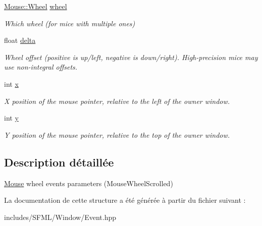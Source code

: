 \begin{DoxyCompactItemize}
\item 
\mbox{\label{structsf_1_1Event_1_1MouseWheelScrollEvent_a1d82dccecc46968d517b2fc66639dd74}} 
\hyperlink{classsf_1_1Mouse_a60dd479a43f26f200e7957aa11803ff4}{Mouse\+::\+Wheel} \hyperlink{structsf_1_1Event_1_1MouseWheelScrollEvent_a1d82dccecc46968d517b2fc66639dd74}{wheel}
\begin{DoxyCompactList}\small\item\em Which wheel (for mice with multiple ones) \end{DoxyCompactList}\item 
\mbox{\label{structsf_1_1Event_1_1MouseWheelScrollEvent_ac45c164997a594d424071e74b53b5817}} 
float \hyperlink{structsf_1_1Event_1_1MouseWheelScrollEvent_ac45c164997a594d424071e74b53b5817}{delta}
\begin{DoxyCompactList}\small\item\em Wheel offset (positive is up/left, negative is down/right). High-\/precision mice may use non-\/integral offsets. \end{DoxyCompactList}\item 
\mbox{\label{structsf_1_1Event_1_1MouseWheelScrollEvent_a3d17cae0568d18083f879655abdc8ae4}} 
int \hyperlink{structsf_1_1Event_1_1MouseWheelScrollEvent_a3d17cae0568d18083f879655abdc8ae4}{x}
\begin{DoxyCompactList}\small\item\em X position of the mouse pointer, relative to the left of the owner window. \end{DoxyCompactList}\item 
\mbox{\label{structsf_1_1Event_1_1MouseWheelScrollEvent_aa38bf23704162024eed19917eef3853c}} 
int \hyperlink{structsf_1_1Event_1_1MouseWheelScrollEvent_aa38bf23704162024eed19917eef3853c}{y}
\begin{DoxyCompactList}\small\item\em Y position of the mouse pointer, relative to the top of the owner window. \end{DoxyCompactList}\end{DoxyCompactItemize}


\subsection{Description détaillée}
\hyperlink{classsf_1_1Mouse}{Mouse} wheel events parameters (Mouse\+Wheel\+Scrolled) 

La documentation de cette structure a été générée à partir du fichier suivant \+:\begin{DoxyCompactItemize}
\item 
includes/\+S\+F\+M\+L/\+Window/Event.\+hpp\end{DoxyCompactItemize}
